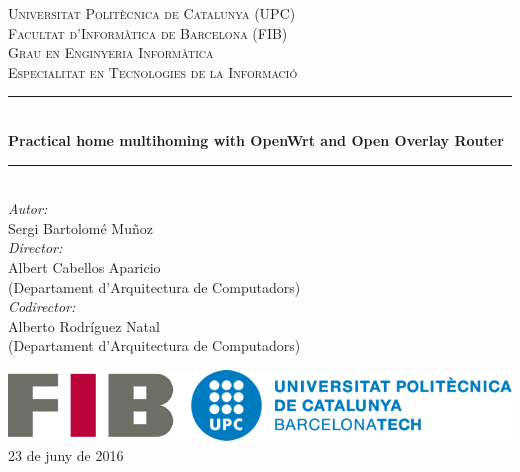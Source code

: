 \documentclass[11pt]{article}
\begin{document}
\begin{titlepage}
\newcommand{\HRule}{\rule{\linewidth}{0.5mm}} %

\begin{center}

\textsc{\LARGE Universitat Politècnica de Catalunya (UPC)}\\[1.5cm]
\textsc{\Large Facultat d'Informàtica de Barcelona (FIB)}\\[0.5cm]
\textsc{\large Grau en Enginyeria Informàtica\\Especialitat en Tecnologies de la Informació}\\[1.5cm]

\HRule \\[0.4cm]
{\huge \bfseries Practical home multihoming with OpenWrt and Open Overlay Router}\\
\HRule \\[1.5cm]

{\Large \emph{Autor:}\\
Sergi Bartolomé Muñoz}\\[1cm]
{\large \emph{Director:}\\
Albert Cabellos Aparicio\\
(Departament d'Arquitectura de Computadors)\\[0.5cm]
\emph{Codirector:}\\
Alberto Rodríguez Natal\\
(Departament d'Arquitectura de Computadors)}

\vfill

\includegraphics[scale=0.3]{fib-upc}\\[1cm]

{\large 23 de juny de 2016}\\[3cm]

\end{center}
\end{titlepage}

\newpage
\setcounter{page}{0}					%
\thispagestyle{empty}
\mbox{}
\vfill
\end{document}
